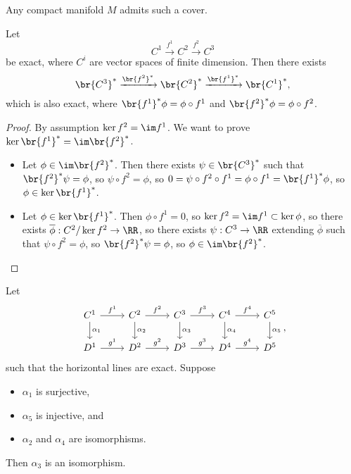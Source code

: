 Any compact manifold $ M $ admits such a cover.

\begin{lemma}
\label{lem:2.53}
Let
$$ C^1 \xrightarrow{f^1} C^2 \xrightarrow{f^2} C^3 $$
be exact, where $ C^i $ are vector spaces of finite dimension. Then there exists
$$ \br{C^3}^* \xrightarrow{\br{f^2}^*} \br{C^2}^* \xrightarrow{\br{f^1}^*} \br{C^1}^*, $$
which is also exact, where $ \br{f^1}^*\phi = \phi \circ f^1 $ and $ \br{f^2}^*\phi = \phi \circ f^2 $.
\end{lemma}

\begin{proof}
By assumption $ \ker f^2 = \im f^1 $. We want to prove $ \ker \br{f^1}^* = \im \br{f^2}^* $.
\begin{itemize}
\item Let $ \phi \in \im \br{f^2}^* $. Then there exists $ \psi \in \br{C^3}^* $ such that $ \br{f^2}^*\psi = \phi $, so $ \psi \circ f^2 = \phi $, so $ 0 = \psi \circ f^2 \circ f^1 = \phi \circ f^1 = \br{f^1}^*\phi $, so $ \phi \in \ker \br{f^1}^* $.
\item Let $ \phi \in \ker \br{f^1}^* $. Then $ \phi \circ f^1 = 0 $, so $ \ker f^2 = \im f^1 \subset \ker \phi $, so there exists $ \overline{\phi} : C^2 / \ker f^2 \to \RR $, so there exists $ \psi : C^3 \to \RR $ extending $ \overline{\phi} $ such that $ \psi \circ f^2 = \phi $, so $ \br{f^2}^*\psi = \phi $, so $ \phi \in \im \br{f^2}^* $.
\end{itemize}
\end{proof}

\begin{lemma}
Let
$$
\begin{tikzcd}
C^1 \arrow{r}{f^1} \arrow{d}{\alpha_1} & C^2 \arrow{r}{f^2} \arrow{d}{\alpha_2} & C^3 \arrow{r}{f^3} \arrow{d}{\alpha_3} & C^4 \arrow{r}{f^4} \arrow{d}{\alpha_4} & C^5 \arrow{d}{\alpha_5} \\
D^1 \arrow{r}{g^1} & D^2 \arrow{r}{g^2} & D^3 \arrow{r}{g^3} & D^4 \arrow{r}{g^4} & D^5
\end{tikzcd},
$$
such that the horizontal lines are exact. Suppose
\begin{itemize}
\item $ \alpha_1 $ is surjective,
\item $ \alpha_5 $ is injective, and
\item $ \alpha_2 $ and $ \alpha_4 $ are isomorphisms.
\end{itemize}
Then $ \alpha_3 $ is an isomorphism.
\end{lemma}

